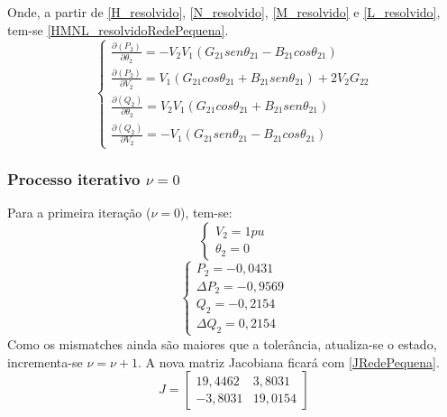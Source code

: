 Onde, a partir de \ref{H_resolvido}, \ref{N_resolvido}, \ref{M_resolvido} e \ref{L_resolvido}, tem-se \ref{HMNL_resolvidoRedePequena}.
\begin{equation}
  \left\{    \begin{array}{llll}
                \frac{\partial (P_2)}{\partial \theta_2} =-V_2 V_1 (G_{21} sen\theta_{21} - B_{21}cos\theta_{21})\\
                \frac{\partial (P_2)}{\partial V_2} =V_1(G_{21} cos\theta_{21} + B_{21}sen\theta_{21}) + 2V_2G_{22}\\
                \frac{\partial (Q_2)}{\partial \theta_2} = V_2 V_1 (G_{21} cos\theta_{21} + B_{21}sen\theta_{21})\\
                \frac{\partial (Q_2)}{\partial V_2} =-V_1 (G_{21} sen\theta_{21} - B_{21}cos\theta_{21})
            \end{array}\right.
    \label{HMNL_resolvidoRedePequena}
\end{equation}
\subsubsection{Processo iterativo $\nu=0$}
Para a primeira iteração ($\nu=0$), tem-se:
\begin{equation}
  \left\{    \begin{array}{llll}
                V_2=1pu\\
                \theta_2=0
    \end{array}\right.
\label{RedePequenaItera0a}
\end{equation}
\begin{equation}
    \left\{    \begin{array}{llll}
                P_2= -0,0431\\
                \Delta P_2 = -0,9569\\
                Q_2 = -0,2154\\
                \Delta Q_2 = 0,2154
            \end{array}\right.
    \label{RedePequenaItera0b}
\end{equation}
Como os mismatches ainda são maiores que a tolerância, atualiza-se o estado, incrementa-se $\nu=\nu+1$. A nova matriz Jacobiana ficará com \ref{JRedePequena}.
\begin{equation}
   J = \left[ 
    \begin{matrix} 
        19,4462 & 3,8031  \\ 
        -3,8031 & 19,0154  
    \end{matrix} \right] 
    \label{JRedePequena}
\end{equation}

